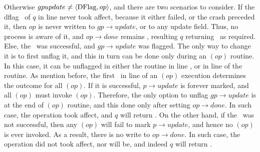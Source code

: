 Otherwise $gpupdate \neq \langle \mbox{DFlag}, op \rangle$, and there are two scenarios to consider. If the dflag \CASB\ of $q$ in line  never took affect, because it either failed, or the crash preceded it, then $op$ is never written to $gp\rightarrow update$, or to any update field. Thus, no process is aware of it, and $op\rightarrow done$ remains \FALSE, resulting $q$ returning \FAIL\ as required. Else, the \CASB\ was successful, and $gp\rightarrow update$ was flagged. The only way to change it is to first unflag it, and this in turn can be done only during an $(op)$ routine. In this case, it can be unflagged in either the  routine in line , or in line  of the  routine. As mention before, the first \CASB\ in line  of an $(op)$ execution determines the outcome for all $(op)$. If it is successful, $p\rightarrow update$ is forever marked, and all $(op)$ must invoke $(op)$. Therefore, the only option to unflag $gp\rightarrow update$ is at the end of $(op)$ routine, and this done only after setting $op\rightarrow done$. In such case, the  operation took affect, and $q$ will return \TRUE. On the other hand, if the \CASB\ was not successful, then any $(op)$ will fail to mark $p\rightarrow update$, and hence no $(op)$ is ever invoked. As a result, there is no write to $op\rightarrow done$. In such case, the  operation did not took affect, nor will be, and indeed $q$ will return \FAIL. 





